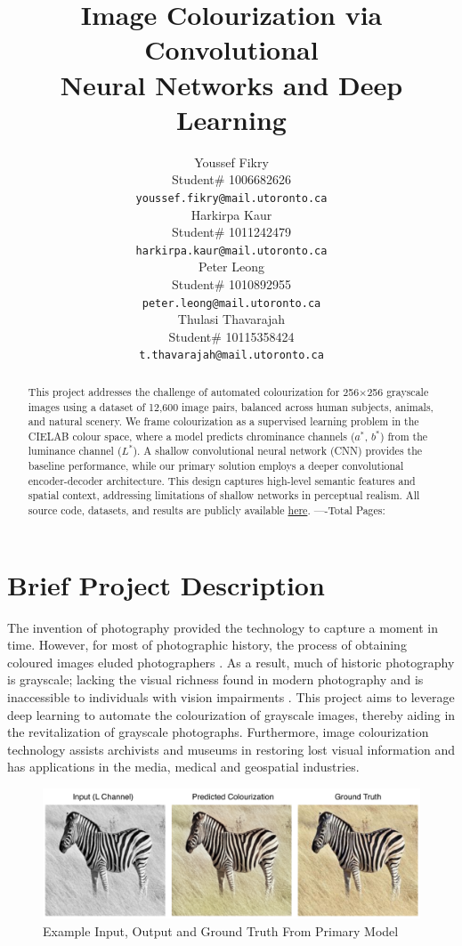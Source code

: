 \documentclass{article} %
\title{Image Colourization via Convolutional \\
Neural Networks and Deep Learning}
\author{Youssef Fikry  \\
Student\# 1006682626\\
\texttt{youssef.fikry@mail.utoronto.ca} \\
\And Harkirpa Kaur  \\
Student\# 1011242479 \\
\texttt{harkirpa.kaur@mail.utoronto.ca} \\
\AND
Peter Leong \\
Student\# 1010892955 \\
\texttt{peter.leong@mail.utoronto.ca} \\
\And
Thulasi Thavarajah \\
Student\# 10115358424 \\
\texttt{t.thavarajah@mail.utoronto.ca} \\
\AND
}
\begin{document}
\maketitle

\begin{abstract}
This project addresses the challenge of automated colourization for 256$\times$256 grayscale images using a dataset of 12,600 image pairs, balanced across human subjects, 
animals, and natural scenery. We frame colourization as a supervised learning problem in the CIELAB colour space, where a model predicts chrominance channels ($a^*$, $b^*$) 
from the luminance channel ($L^*$). A shallow convolutional neural network (CNN) provides the baseline performance, while our primary solution employs a deeper convolutional encoder-decoder architecture. This 
design captures high-level semantic features and spatial context, addressing limitations of shallow networks in perceptual realism. All source code, datasets, and results 
are publicly available \href{https://drive.google.com/drive/folders/1cV1NhlQ8UTk_CgJdwhqeRu0z5xE85ZsI?usp=sharing}{here}. 
----Total Pages: \pageref{last_page}
\end{abstract}


\section{Brief Project Description}

The invention of photography provided the technology to capture a moment in time. However, for most of photographic history, the process of obtaining coloured images eluded photographers \citep{scienceandmediamuseum2020}. As a result, much of historic photography is grayscale; lacking the visual richness found in modern photography and is inaccessible to individuals with vision impairments \citep{vogelsang2024impact}. This project aims to leverage deep learning to automate the colourization of grayscale images, thereby aiding in the revitalization of grayscale photographs. Furthermore, image colourization technology assists archivists and museums in restoring lost visual information and has applications in the media, medical and geospatial industries. 

\begin{figure}[h]            %
  \centering
  \includegraphics[width=0.99\linewidth]{Figs/final-model-example.png}
  \caption{Example Input, Output and Ground Truth From Primary Model}
  \label{fig:final-model}
\end{figure}
\end{document}
